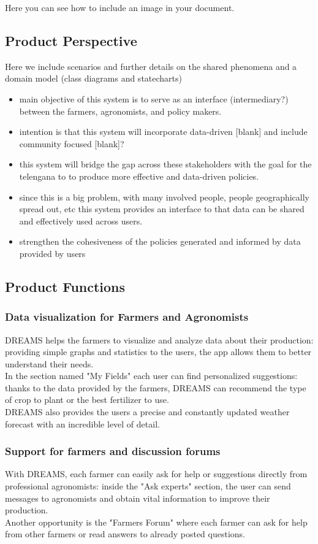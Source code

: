 Here you can see how to include an image in your document.

\subsection{Product Perspective}
Here we include scenarios and further details on the shared phenomena and a domain model (class diagrams and statecharts)


\begin{itemize}
\item
main objective of this system is to serve as an interface (intermediary?) between the farmers, agronomists, and policy makers. 
\item
intention is that this system will incorporate data-driven [blank] and include community focused [blank]? 
\item
this system will bridge the gap across these stakeholders with the goal for the telengana to to produce more effective and data-driven policies.
\item
since this is a big problem, with many involved people, people geographically spread out, etc this system provides an interface to that data can be shared and effectively used across users. 
\item
strengthen the cohesiveness of the policies generated and informed by data provided by users
\end{itemize}


\subsection{Product Functions}

\subsubsection{Data visualization for Farmers and Agronomists}
DREAMS helps the farmers to visualize and analyze data about their production: providing simple graphs and statistics to the users, the app allows them to better understand their needs.\\
In the section named "My Fields" each user can find personalized suggestions: thanks to the data provided by the farmers, DREAMS can recommend the type of crop to plant or the best fertilizer to use.\\
DREAMS also provides the users a precise and constantly updated weather forecast with an incredible level of detail.

\subsubsection{Support for farmers and discussion forums}
With DREAMS, each farmer can easily ask for help or suggestions directly from professional agronomists: inside the "Ask experts" section, the user can send messages to agronomists and obtain vital information to improve their production.\\
Another opportunity is the "Farmers Forum" where each farmer can ask for help from other farmers or read answers to already posted questions.

